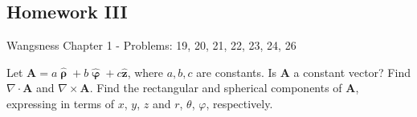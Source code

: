 \documentclass[crop=false,class=book,oneside]{standalone}
\begin{document}
        \subsection{Homework III}
            Wangsness Chapter 1 - Problems: 19, 20, 21, 22, 23, 24, 26
            \begin{problem}[Wangsness 1-19]
                Let
                $\mathbf{A}%
                 =a\hat{\boldsymbol{\uprho}}%
                 +b\hat{\boldsymbol{\upvarphi}}%
                 +c\hat{\mathbf{z}}$,
                where $a,b,c$ are constants. Is $\mathbf{A}$ a
                constant vector? Find $\nabla\cdot\mathbf{A}$ and
                $\nabla\times\mathbf{A}$. Find the rectangular
                and spherical components of $\mathbf{A}$, expressing
                in terms of $x$, $y$, $z$ and
                $r$, $\theta$, $\varphi$, respectively.
            \end{problem}
\end{document}
